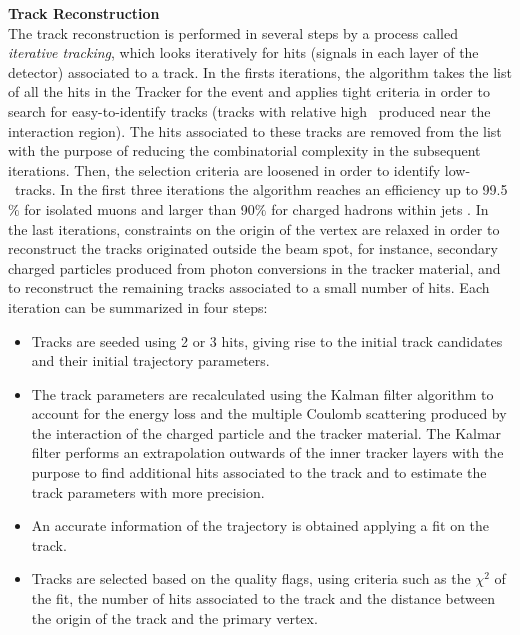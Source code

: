 \textbf{Track Reconstruction}\\

\noindent The track reconstruction is performed in several steps by a process called \textit{iterative tracking}, which
looks iteratively for hits (signals in each layer of the detector) associated to a track. In the firsts iterations, 
the algorithm takes the list of all the hits in the Tracker for the event and applies tight criteria 
in order to search for easy-to-identify tracks (tracks with relative high \pt~produced near the interaction region). The
hits associated to these tracks are removed from the list with the purpose of reducing the 
combinatorial complexity in the subsequent iterations. Then, the selection criteria are loosened 
in order to identify low-\pt~tracks. In the first three iterations the algorithm reaches an 
efficiency up to 99.5$\%$ for isolated muons and larger than 90$\%$ for 
charged hadrons within jets \cite{PFAlgorithm}. In the last iterations, constraints on the origin of the vertex
are relaxed in order to reconstruct the tracks originated outside the beam spot, for instance, secondary 
charged particles produced from photon conversions in the tracker material, and to reconstruct the remaining 
tracks associated to a small number of hits. Each iteration can be summarized in four steps:\\

\begin{itemize}
 \item Tracks are seeded using 2 or 3 hits, giving rise to the initial track candidates and their initial trajectory parameters.
 \item The track parameters are recalculated using the Kalman filter algorithm \cite{KalmanAlgorithm} to 
       account for the energy loss and the multiple Coulomb scattering produced by the interaction of the 
       charged particle and the tracker material. The Kalmar filter performs an extrapolation outwards of 
       the inner tracker layers with the purpose to find additional hits associated to the track 
       and to estimate the track parameters with more precision.
 \item An accurate information of the trajectory is obtained applying a fit on the track.
 \item Tracks are selected based on the quality flags, using criteria such as the $\chi^{2}$ of the fit, the number of 
       hits associated to the track and the distance between the origin of the track and the primary vertex.
\end{itemize}

